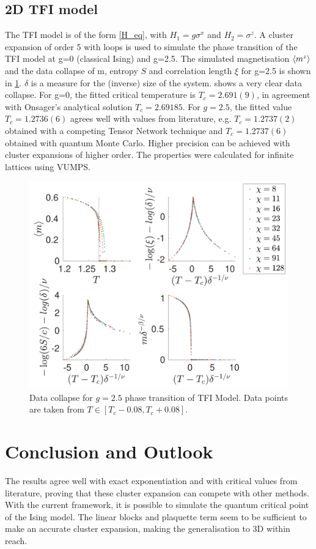 \documentclass[twocolumn]{article}
\newcounter{a}
\newcounter{b}
\begin{document}
\subsection{2D TFI model}
The TFI model is of the form \cref{H_eq}, with $H_1=g  \sigma ^x$ and $H_2= \sigma^z$. A cluster expansion of order 5 with loops is used to simulate the phase transition of the TFI model at g=0 (classical Ising) and g=2.5. The simulated magnetisation $ \Braket{m^z}$ and the data collapse of m, entropy $S$ and correlation length $\xi$ for g=2.5 is shown in \cref{fig:phase:g25:zoomed}. $\delta$ is a measure for the (inverse) size of the system.  shows a very clear data collapse. For g=0, the fitted critical temperature is $T_c = 2.691(9)$, in agreement with Onsager's analytical solution $T_c = 2.69185$. For $g=2.5$, the fitted value $T_c=1.2736(6)$ agrees well with values from literature, e.g. $T_c=1.2737(2)$ obtained with a competing Tensor Network technique and $T_c=1.2737(6)$ obtained with quantum Monte Carlo. \cite{Czarnik2019} Higher precision can be achieved with cluster expansions of higher order. The properties were calculated for infinite lattices using VUMPS.

\begin{figure}[h!]
    \center
    \includegraphics[width=\linewidth]{../Figuren/phasediag/g25/zoomed_small.pdf}
    \caption{ Data collapse for $g=2.5$ phase transition of TFI  Model. Data points are taken from $T \in \left[ T_c -0.08, T_c +0.08 \right]$. }
    \label{fig:phase:g25:zoomed}
\end{figure}

\section{Conclusion and Outlook}

The results agree well with exact exponentiation and with critical values from literature, proving that these cluster expansion can compete with other methods. With the current framework, it is possible to simulate the quantum critical point of the Ising model. The linear blocks and plaquette term seem to be sufficient to make an accurate cluster expansion, making the generalisation to 3D within reach.

\small


\end{document}
